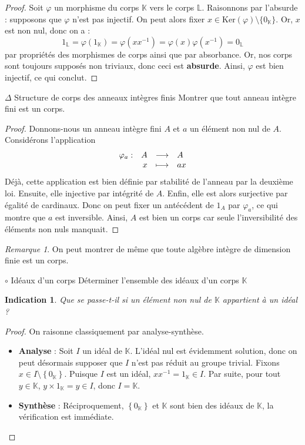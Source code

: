 \documentclass[french,a4paper]{article}
\newcommand{\K}{\mathbb{K}}
\renewcommand{\L}{\mathbb{L}}
\newcommand{\inv}{^{-1}}
\renewcommand{\ker}{\text{Ker}}
\theoremstyle{plain}
\newtheorem*{ind}{Indication}
\theoremstyle{definition}
\theoremstyle{remark}
\newtheorem*{rmq}{Remarque}
\begin{document}
\begin{proof}
	Soit $\varphi$ un morphisme du corps $\K$ vers le corps $\L$. Raisonnons par l'absurde : supposons que $\varphi$ n'est pas injectif. On peut alors fixer $x \in \ker(\varphi) \setminus \{0_\K\}$. Or, $x$ est non nul, donc on a : $$1_\L=\varphi(1_\K)=\varphi(xx\inv)=\varphi(x)\varphi(x\inv)=0_\L$$ par propriétés des morphismes de corps ainsi que par absorbance. Or, nos corps sont toujours supposés non triviaux, donc ceci est \textbf{absurde}. Ainsi, $\varphi$ est bien injectif, ce qui conclut.
\end{proof}

\begin{ex}[Morlot]{$\Delta$ Structure de corps des anneaux intègres finis}
	Montrer que tout anneau intègre fini est un corps.
\end{ex}

\begin{proof}
	Donnons-nous un anneau intègre fini $A$ et $a$ un élément non nul de $A$. Considérons l'application
	$$
	\begin{array}[t]{lrcl}
		\varphi_a : & A & \longrightarrow & A \\
		& x & \longmapsto & ax
	\end{array}
	$$
	Déjà, cette application est bien définie par stabilité de l'anneau par la deuxième loi. Ensuite, elle injective par intégrité de $A$. Enfin, elle est alors surjective par égalité de cardinaux. Donc on peut fixer un antécédent de $1_A$ par $\varphi_a$, ce qui montre que $a$ est inversible. Ainsi, $A$ est bien un corps car seule l'inversibilité des éléments non nuls manquait.
\end{proof}

\begin{rmq}
	On peut montrer de même que toute algèbre intègre de dimension finie est un corps.
\end{rmq}

\begin{ex}[Morlot]{$\circ$ Idéaux d'un corps}
	Déterminer l'ensemble des idéaux d'un corps $\K$
\end{ex}

\begin{ind}
	Que se passe-t-il si un élément non nul de $\K$ appartient à un idéal ?
\end{ind}

\begin{proof}
	On raisonne classiquement par analyse-synthèse.
	\begin{itemize}
		\item \textbf{Analyse} : Soit $I$ un idéal de $\K$. L'idéal nul est évidemment solution, donc on peut désormais supposer que $I$ n'est pas réduit au groupe trivial. Fixons $x \in I\setminus\left\{0_\K \right\}$. Puisque $I$ est un idéal, $xx\inv=1_\K \in I$. Par suite, pour tout $y \in\K$, $y\times 1_\K=y \in I$, donc $I=\K$.
		\item \textbf{Synthèse} : Réciproquement, $\left\{0_\K \right\}$ et $\K$ sont bien des idéaux de $\K$, la vérification est immédiate.
	\end{itemize}
\end{proof}
\end{document}
